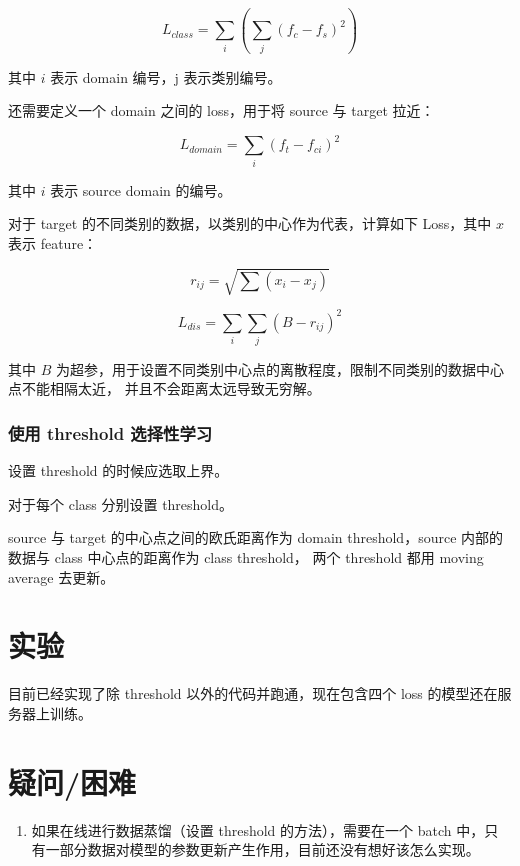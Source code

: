 \documentclass[UTF8]{ctexart}
\begin{document}
$$
L_{class} = \sum_i(\sum_j(f_c - f_s)^2)
$$

其中 $i$ 表示 domain 编号，j 表示类别编号。

还需要定义一个 domain 之间的 loss，用于将 source 与 target 拉近：

$$
L_{domain} = \sum_i(f_t - f_{ci})^2
$$

其中 $i$ 表示 source domain 的编号。

对于 target 的不同类别的数据，以类别的中心作为代表，计算如下 Loss，其中 $x$ 表示 feature：

$$
r_{ij} = \sqrt{\sum(x_i - x_j)}
$$

$$
L_{dis} = \sum_i\sum_j(B - r_{ij})^2
$$

其中 $B$ 为超参，用于设置不同类别中心点的离散程度，限制不同类别的数据中心点不能相隔太近，
并且不会距离太远导致无穷解。

\subsubsection{使用 threshold 选择性学习}

设置 threshold 的时候应选取上界。

对于每个 class 分别设置 threshold。

source 与 target 的中心点之间的欧氏距离作为 domain threshold，source 内部的数据与 class 中心点的距离作为 class threshold，
两个 threshold 都用 moving average 去更新。

\section{实验}

目前已经实现了除 threshold 以外的代码并跑通，现在包含四个 loss 的模型还在服务器上训练。

\section{疑问/困难}

\begin{enumerate}
    \item 如果在线进行数据蒸馏（设置 threshold 的方法），需要在一个 batch 中，只有一部分数据对模型的参数更新产生作用，目前还没有想好该怎么实现。
\end{enumerate}
\end{document}
